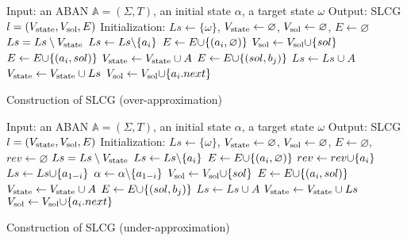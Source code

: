 \begin{algorithm}[ht]
\begin{algorithmic}
    \State Input: an ABAN $\mathbb{A}=(\Sigma,T)$, an initial state $\alpha$, a target state $\omega$
    \State Output: SLCG $l=(V_{\mathrm{state}},V_{\mathrm{sol}}, E)$
    \State Initialization: 
    $Ls\gets \{\omega\}$, $V_{\mathrm{state}}\gets\varnothing$, $V_{\mathrm{sol}}\gets \varnothing$, $E\gets \varnothing$
        \State $Ls=Ls\setminus V_{\mathrm{state}}$
    		\State $Ls\gets Ls\miset{a_i}$
    			\State $E\gets E\addset{(a_i,\varnothing)} $
        	\Else
        	    \State{\textcolor{gray}{// Choose the transitions reaching $a_i$}}
        		    \State $V_\sol\gets V_\sol\addset{sol}$
        		    \State $E\gets E\addset{(a_i,sol)} $
        			\State $V_{\mathrm{state}}\gets V_{\mathrm{state}}\cup{A}$
        				\State $E\gets E\addset{(sol,b_j)} $
        			\EndFor
        			\State $Ls\gets Ls\cup A$
                    \State $V_{\mathrm{state}}\gets V_{\mathrm{state}}\cup Ls$
        		\EndFor
        		\State$V_\sol\gets V_\sol\addset{a_i.next}$           
        	\EndIf
    	\EndFor
    \EndWhile
    \State{}
\end{algorithmic}
\caption{Construction of SLCG (over-approximation)}\label{AlgConstructLCG}
\end{algorithm}

\begin{algorithm}[ht]
\begin{algorithmic}
    \State Input: an ABAN $\mathbb{A}=(\Sigma,T)$, an initial state $\alpha$, a target state $\omega$
    \State Output: SLCG $l=(V_{\mathrm{state}},V_{\mathrm{sol}}, E)$
    \State Initialization: 
    $Ls\gets \{\omega\}$, $V_{\mathrm{state}}\gets\varnothing$, $V_{\mathrm{sol}}\gets \varnothing$, $E\gets \varnothing$, $rev\gets \varnothing$
        \State $Ls=Ls\setminus V_{\mathrm{state}}$
    		\State $Ls\gets Ls\miset{a_i}$
    			\State $E\gets E\addset{(a_i,\varnothing)}$
    			\State $rev\gets rev\addset{a_i}$
        	\Else
        	        \State $Ls\gets Ls\addset{a_{1-i}}$
        	        \State $\alpha\gets\alpha\miset{a_{1-i}}$
        	    \EndIf
        	    \State{\textcolor{gray}{// Choose the transitions reaching $a_i$}}
        		    \State $V_\sol\gets V_\sol\addset{sol}$
        		    \State $E\gets E\addset{(a_i,sol)} $
        			\State $V_{\mathrm{state}}\gets V_{\mathrm{state}}\cup{A}$
        				\State $E\gets E\addset{(sol,b_j)} $
        			\EndFor
        			\State $Ls\gets Ls\cup A$
                    \State $V_{\mathrm{state}}\gets V_{\mathrm{state}}\cup Ls$
        		\EndFor
        		\State$V_\sol\gets V_\sol\addset{a_i.next}$           
        	\EndIf
    	\EndFor
    \EndWhile
    \State{}
\end{algorithmic}
\caption{Construction of SLCG (under-approximation)}\label{AlgConstructLCGUnder}
\end{algorithm}

